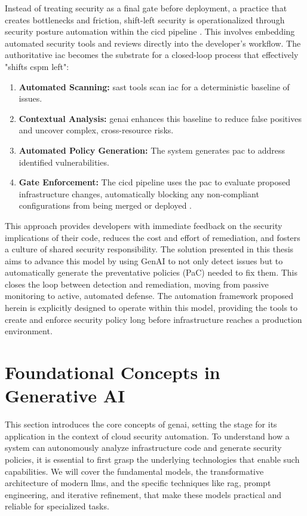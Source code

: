 Instead of treating security as a final gate before deployment, a practice that creates bottlenecks and friction, shift-left security is operationalized through security posture automation within the \gls{cicd} pipeline \cite{fu_ai_2025}. This involves embedding automated security tools and reviews directly into the developer's workflow. The authoritative \gls{iac} becomes the substrate for a closed-loop process that effectively "shifts \gls{cspm} left":
\begin{enumerate}
    \item \textbf{Automated Scanning:} \gls{sast} tools scan \gls{iac} for a deterministic baseline of issues.
    \item \textbf{Contextual Analysis:} \gls{genai} enhances this baseline to reduce false positives and uncover complex, cross-resource risks.
    \item \textbf{Automated Policy Generation:} The system generates \gls{pac} to address identified vulnerabilities.
    \item \textbf{Gate Enforcement:} The \gls{cicd} pipeline uses the \gls{pac} to evaluate proposed infrastructure changes, automatically blocking any non-compliant configurations from being merged or deployed \cite{gunathilaka_context-aware_2025-1}.
\end{enumerate}
This approach provides developers with immediate feedback on the security implications of their code, reduces the cost and effort of remediation, and fosters a culture of shared security responsibility. The solution presented in this thesis aims to advance this model by using GenAI to not only detect issues but to automatically generate the preventative policies (PaC) needed to fix them. This closes the loop between detection and remediation, moving from passive monitoring to active, automated defense. The automation framework proposed herein is explicitly designed to operate within this model, providing the tools to create and enforce security policy long before infrastructure reaches a production environment.


\section{Foundational Concepts in Generative AI}
\label{sec:foundational_genai}

This section introduces the core concepts of \gls{genai}, setting the stage for its application in the context of cloud security automation. To understand how a system can autonomously analyze infrastructure code and generate security policies, it is essential to first grasp the underlying technologies that enable such capabilities. We will cover the fundamental models, the transformative architecture of modern \glspl{llm}, and the specific techniques like \gls{rag}, prompt engineering, and iterative refinement, that make these models practical and reliable for specialized tasks.

